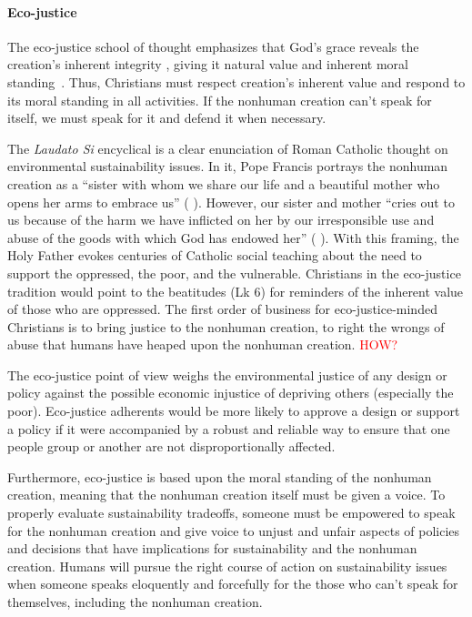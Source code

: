 \documentclass[12pt]{article}
\newcommand{\ins}[1]{\textcolor{red}{#1}}
\begin{document}
\paragraph{Eco-justice} 
\label{sec:eco-justice}

The eco-justice school of thought 
emphasizes that God's grace reveals the creation's 
inherent integrity \autocite[19]{Jenkins:2008}, 
giving it natural value and inherent moral standing~\autocite{Joldersma:2019}. 
Thus, Christians must respect creation's inherent value and 
respond to its moral standing in all activities.
If the nonhuman creation can't speak for itself, 
we must speak for it and defend it when necessary.

The \emph{Laudato Si} encyclical \autocite{Pope-Francis:2015aa} 
is a clear enunciation of Roman Catholic thought
on environmental sustainability issues.
In it, Pope Francis portrays the nonhuman creation as a
``sister with whom we share our life and a beautiful mother who opens her arms to embrace us''
(\textcite{Pope-Francis:2015aa} \textcite[3]{Pope-Francis:2015aa}).
However, our sister and mother
``cries out to us because of the harm we have inflicted on her 
by our irresponsible use and abuse of the goods with which God has endowed her''
(\textcite{Pope-Francis:2015aa} \textcite[3]{Pope-Francis:2015aa}).
With this framing, the Holy Father evokes centuries of Catholic social teaching
about the need to support the oppressed, the poor, and the vulnerable.
Christians in the eco-justice tradition would point to the beatitudes (Lk 6) 
for reminders of the inherent value of those who are oppressed.
The first order of business for eco-justice-minded Christians
is to bring justice to the nonhuman creation, to right the wrongs
of abuse that humans have heaped upon the nonhuman creation. \ins{HOW?}

The eco-justice point of view
weighs the environmental justice of any design or policy
against the possible economic injustice of depriving others
(especially the poor). 
Eco-justice adherents would be more likely to approve a design or support a policy if it
were accompanied by a robust and reliable way to ensure that one people group or another
are not disproportionally affected.

Furthermore, eco-justice is based upon the moral standing of the nonhuman creation,
meaning that the nonhuman creation itself must be given a voice.
To properly evaluate sustainability tradeoffs,
someone must be empowered to speak for the nonhuman creation and
give voice to unjust and unfair aspects of policies and decisions
that have implications for sustainability and the nonhuman creation.
Humans will pursue the right course of action on sustainability issues
when someone speaks eloquently and forcefully for the
those who can't speak for themselves, including the nonhuman creation.
\end{document}
